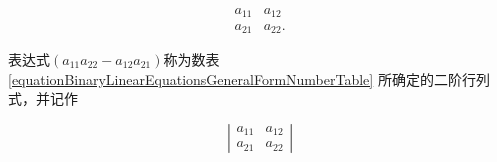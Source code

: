 \begin{equation} \label{equationBinaryLinearEquationsGeneralFormNumberTable}
\begin{array}{cc}
a_{11} & a_{12}\\
a_{21} & a_{22}.
\end{array}
\end{equation}

表达式$ (a_{11}a_{22}-a_{12}a_{21}) $称为数表 \ref{equationBinaryLinearEquationsGeneralFormNumberTable} 所确定的二阶行列式，并记作

\begin{equation} 
\left | \begin{array}{cc}
a_{11} & a_{12}\\
a_{21} & a_{22}
\end{array} \right |
\end{equation}

